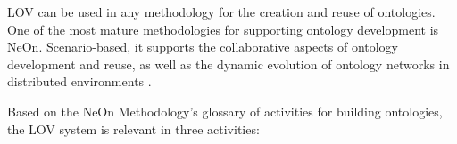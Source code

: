 \documentclass{iosart2c}
\begin{document}
LOV can be used in any methodology for the creation and reuse of ontologies. One of the most mature methodologies for supporting ontology development is NeOn. Scenario-based, it supports the collaborative aspects of ontology development and reuse, as well as the dynamic evolution of ontology networks in distributed environments \cite{MC10}. 

Based on the NeOn Methodology's glossary of activities for building ontologies, the LOV system is relevant in three activities:
\end{document}
